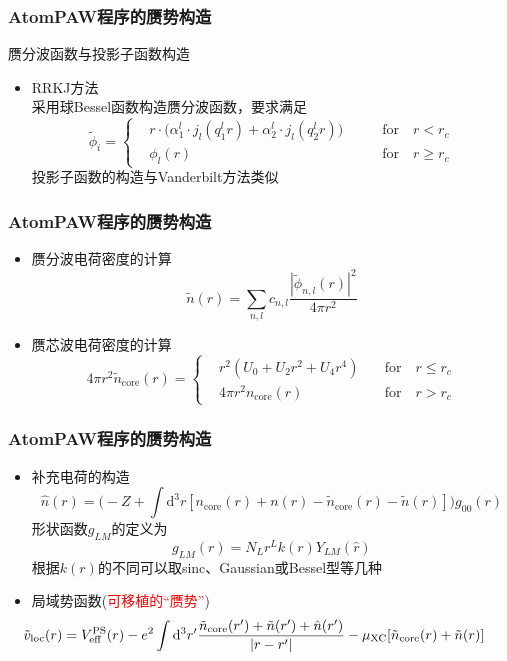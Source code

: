 \frame
{
	\frametitle{\textrm{AtomPAW}程序的赝势构造}
	赝分波函数与投影子函数构造
	\begin{itemize}
		\item \textrm{RRKJ}方法\\
			采用球\textrm{Bessel}函数构造赝分波函数，要求满足
	\begin{displaymath}
		\tilde\phi_i=\left\{
			\begin{aligned}
				&r\cdot\bigg(\alpha_1^l\cdot j_l(q_1^lr)+\alpha_2^l\cdot j_l(q_2^lr)\bigg) \qquad &\mathrm{for}\quad r<r_c \\
				&\phi_l(r)\qquad &\mathrm{for}\quad r\geqslant r_c
			\end{aligned}
			\right.
	\end{displaymath}
	投影子函数的构造与\textrm{Vanderbilt}方法类似
	\end{itemize}
}


\frame
{
	\frametitle{\textrm{AtomPAW}程序的赝势构造}
	\begin{itemize}
		\item 赝分波电荷密度的计算
	$$\tilde n(r)=\sum_{n,l}c_{n,l}\dfrac{|\tilde\phi_{n,l}(r)|^2}{4\pi r^2}$$
		\item 赝芯波电荷密度的计算
	\begin{displaymath}
		4\pi r^2\tilde n_{\mathrm{core}}(r)=\left\{
			\begin{aligned}
				&r^2(U_0+U_2r^2+U_4r^4)\quad &\mathrm{for}\quad r\leqslant r_c \\
				&4\pi r^2n_{\mathrm{core}}(r)\quad &\mathrm{for}\quad r>r_c
			\end{aligned}
			\right.
	\end{displaymath}
	\end{itemize}
}

\frame
{
	\frametitle{\textrm{AtomPAW}程序的赝势构造}
	\begin{itemize}
		\item 补充电荷的构造
			$$\hat n(r)=\bigg(-Z+\int\mathrm{d}^3r[n_{\mathrm{core}}(r)+n(r)-\tilde n_{\mathrm{core}}(r)-\tilde n(r)]\bigg)g_{00}(r)$$
			形状函数$g_{LM}$的定义为$$g_{LM}(r)=N_Lr^Lk(r)Y_{LM}(\hat r)$$
			根据$k(r)$的不同可以取\textrm{sinc}、\textrm{Gaussian}或\textrm{Bessel}型等几种
		\item 局域势函数(\textcolor{red}{可移植的“赝势”})
			{\fontsize{9.5pt}{5.2pt}\selectfont$$\hspace*{-25pt}\tilde v_{\mathrm{loc}}(r)=V_{\mathrm{eff}}^{\mathrm{PS}}(r)-e^2\int\mathrm{d}^3r^{\prime}\dfrac{\tilde n_{\mathrm{core}}(r^{\prime})+\tilde n(r^{\prime})+\hat n(r^{\prime})}{|r-r^{\prime}|}-\mu_{\mathrm{XC}}[\tilde n_{\mathrm{core}}(r)+\tilde n(r)]$$}
	\end{itemize}
}

